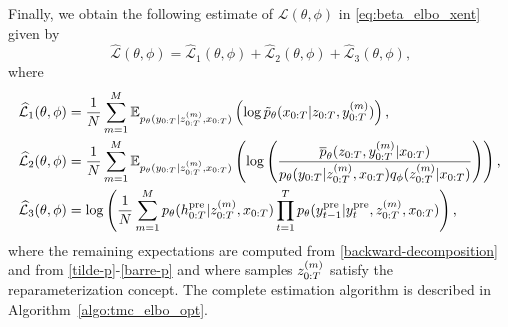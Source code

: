 Finally, we obtain the following estimate
of $\mathcal{L}(\theta,\phi)$ in \eqref{eq:beta_elbo_xent} 
given by
\begin{equation}
\label{L-approx}
\widehat{\mathcal{L}}(\theta,\phi)=\widehat{\mathcal{L}}_1(\theta,\phi)+\widehat{\mathcal{L}}_2(\theta,\phi)+\widehat{\mathcal{L}}_3(\theta,\phi) \text{,}
\end{equation}
where
\begin{align}
\label{L-1-approx}
\widehat{\mathcal{L}}_1(\theta,\phi)&=\frac{1}{N} \sum_{m=1}^M {{\mathbb{E}}}_{p_{\theta}(y_{0:T}|z_{0:T}^{(m)},x_{0:T})} \left( \log \tilde{p}_{\theta}(x_{0:T}|z_{0:T},y_{0:T}^{(m)}) \right) \text{,} \\ 
\label{L-2-approx}
\widehat{\mathcal{L}}_2(\theta,\phi)&=\frac{1}{N} \sum_{m=1}^M {{\mathbb{E}}}_{p_{\theta}(y_{0:T}|z_{0:T}^{(m)},x_{0:T})} \left(\log\left( \frac{\overline{p}_{\theta}(z_{0:T},y_{0:T}^{(m)}|x_{0:T})}{p_{\theta}(y_{0:T}|z_{0:T}^{(m)},x_{0:T})q_\phi(z_{0:T}^{(m)}|x_{0:T})} \right) \right)  \text{,} \\
\label{L-3-approx}
\widehat{\mathcal{L}}_3(\theta,\phi)&= 
\log \left(\frac{1}{N} \sum_{m=1}^M p_{\theta}(h^{\rm pre}_{0:T}|z_{0:T}^{(m)},x_{0:T}) \prod_{t=1}^T p_{\theta}(y_{t-1}^{\rm pre}|y_t^{\rm pre},z_{0:T}^{(m)},x_{0:T})\right) \text{,}
\end{align}
where the remaining expectations are
computed from 
\eqref{backward-decomposition} and from \eqref{tilde-p}-\eqref{barre-p}
and where samples $z_{0:T}^{(m)}$ satisfy the reparameterization concept.
The complete estimation algorithm 
is described in Algorithm~\ref{algo:tmc_elbo_opt}.


